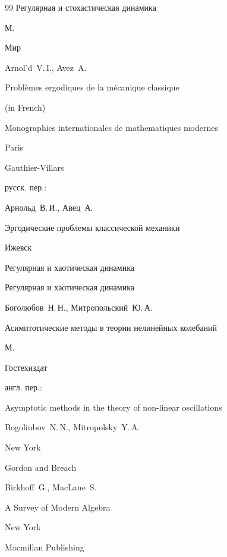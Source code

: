 \begin{thebibliography}{99}
\book Регулярная и стохастическая динамика

\publaddr М.

\publ Мир






\by Arnol'd~V.\,I., Avez~A.

\book Probl\`emes ergodiques de la m\'ecanique classique \nofrills 

\bookinfo (in French)

\serial Monographies internationales de mathematiques modernes


\publaddr Paris

\publ Gauthier-Villars



\rtransl русск. пер.:~

\by  Арнольд~В.\,И., Авец~А.

\book Эргодические проблемы классической механики

\publaddr Ижевск

\publ Регулярная и хаотическая динамика

\serial Регулярная и хаотическая динамика









\by Боголюбов~Н.\,Н., Митропольский~Ю.\,А.

\book Асимптотические методы в теории нелинейных колебаний

\publaddr М.

\publ Гостехиздат



\transl англ. пер.:~

\book Asymptotic methods in the theory of non-linear oscillations

\by Bogoliubov~N.\,N.,  Mitro\-polsky~Y.\,A.

\publaddr New York

\publ Gordon and Breach






\by Birkhoff~G., MacLane~S.

\book  A Survey of Modern Algebra

\publaddr New York

\publ Macmillan Publishing





\end{thebibliography}
